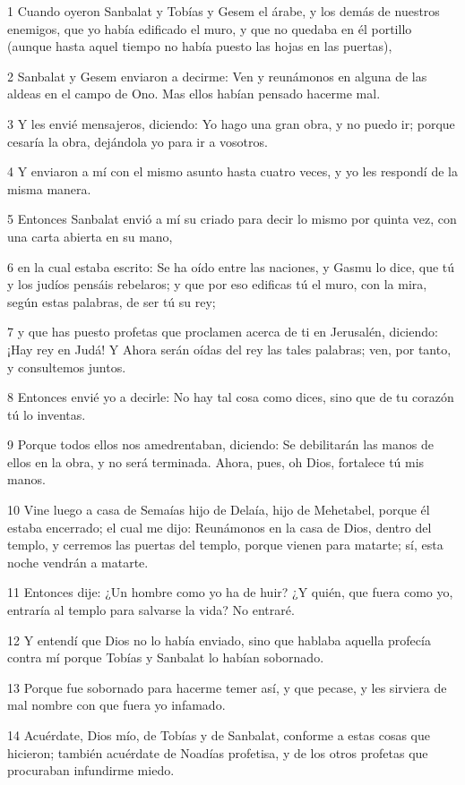 \par 1 Cuando oyeron Sanbalat y Tobías y Gesem el árabe, y los demás de nuestros enemigos, que yo había edificado el muro, y que no quedaba en él portillo (aunque hasta aquel tiempo no había puesto las hojas en las puertas),
\par 2 Sanbalat y Gesem enviaron a decirme: Ven y reunámonos en alguna de las aldeas en el campo de Ono. Mas ellos habían pensado hacerme mal.
\par 3 Y les envié mensajeros, diciendo: Yo hago una gran obra, y no puedo ir; porque cesaría la obra, dejándola yo para ir a vosotros.
\par 4 Y enviaron a mí con el mismo asunto hasta cuatro veces, y yo les respondí de la misma manera.
\par 5 Entonces Sanbalat envió a mí su criado para decir lo mismo por quinta vez, con una carta abierta en su mano,
\par 6 en la cual estaba escrito: Se ha oído entre las naciones, y Gasmu lo dice, que tú y los judíos pensáis rebelaros; y que por eso edificas tú el muro, con la mira, según estas palabras, de ser tú su rey; 
\par 7 y que has puesto profetas que proclamen acerca de ti en Jerusalén, diciendo: ¡Hay rey en Judá! Y Ahora serán oídas del rey las tales palabras; ven, por tanto, y consultemos juntos.
\par 8 Entonces envié yo a decirle: No hay tal cosa como dices, sino que de tu corazón tú lo inventas.
\par 9 Porque todos ellos nos amedrentaban, diciendo: Se debilitarán las manos de ellos en la obra, y no será terminada. Ahora, pues, oh Dios, fortalece tú mis manos.
\par 10 Vine luego a casa de Semaías hijo de Delaía, hijo de Mehetabel, porque él estaba encerrado; el cual me dijo: Reunámonos en la casa de Dios, dentro del templo, y cerremos las puertas del templo, porque vienen para matarte; sí, esta noche vendrán a matarte. 
\par 11 Entonces dije: ¿Un hombre como yo ha de huir? ¿Y quién, que fuera como yo, entraría al templo para salvarse la vida? No entraré.
\par 12 Y entendí que Dios no lo había enviado, sino que hablaba aquella profecía contra mí porque Tobías y Sanbalat lo habían sobornado.
\par 13 Porque fue sobornado para hacerme temer así, y que pecase, y les sirviera de mal nombre con que fuera yo infamado.
\par 14 Acuérdate, Dios mío, de Tobías y de Sanbalat, conforme a estas cosas que hicieron; también acuérdate de Noadías profetisa, y de los otros profetas que procuraban infundirme miedo.
